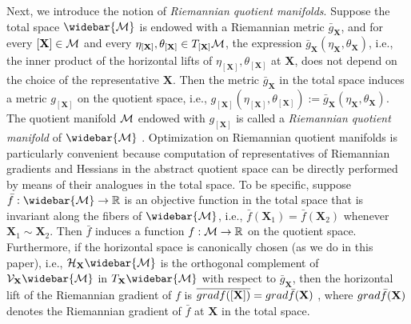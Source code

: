 \documentclass[11pt]{article}
\newcommand{\bbR}{\mathbb{R}}
\newcommand{\cV}{\mathcal{V}}
\newcommand{\cH}{\mathcal{H}}
\newcommand{\0}{{\mathbf{0}}}
\newcommand{\1}{{\mathbf{1}}}
\newcommand{\X}{{\mathbf{X}}}
\newcommand{\cM}{{\cal M}}
\newcommand{\grad}{{\rm grad}}
\newcommand{\nc}{\normalcolor}
\begin{document}
Next, we introduce the notion of {\it Riemannian quotient manifolds}. Suppose the total space $\widebar{\cM}$ is endowed with a Riemannian metric $\bar{g}_\X$, and for every $[\X] \in \cM$ and every $\eta_{[\X]}, \theta_{[\X]} \in T_{[\X]} \cM$, the expression $\bar{g}_\X(\eta_\X, \theta_\X )$, i.e., the inner product of the horizontal lifts of $\eta_{[\X]}, \theta_{[\X]}$ at $\X$, does not depend on the choice of the representative $\X$. Then the metric $\bar{g}_\X$ in the total space induces a metric $g_{[\X]}$ on the quotient space, i.e., $g_{[\X]}(\eta_{[\X]}, \theta_{[\X]}):= \bar{g}_\X(\eta_\X, \theta_\X)$. The quotient manifold $\cM$ endowed with $g_{[\X]}$ is called a {\it Riemannian quotient manifold} of $\widebar{\cM}$ \cite[Section 3.6.2]{absil2009optimization}. Optimization on Riemannian quotient manifolds is particularly convenient because computation of representatives of Riemannian gradients and Hessians in the abstract quotient space can be directly performed by means of their analogues in the total space. To be specific, suppose $\bar{f}: \widebar{\cM} \to \bbR$ is an objective function in the total space that is invariant along the fibers of $\widebar{\cM}$, i.e., $\bar{f}(\X_1) = \bar{f}(\X_2)$ whenever $\X_1 \sim \X_2$. Then $\bar{f}$ induces a function $f: \cM \to \bbR$ on the quotient space. Furthermore, if the horizontal space is canonically chosen (as we do in this paper)\nc, i.e., $\cH_\X \widebar{\cM}$ is the orthogonal complement of $\cV_\X \widebar{\cM}$ in $T_\X \widebar{\cM}$ with respect to $\bar{g}_\X$, then the horizontal lift of the Riemannian gradient of $f$ is $\overline{\grad f([\X])} = \grad \bar{f} (\X)$ \cite[Section 3.6.2]{absil2009optimization}, where $\grad \bar{f}(\X)$ denotes the Riemannian gradient of $\bar{f}$ at $\X$ in the total space.
\end{document}
